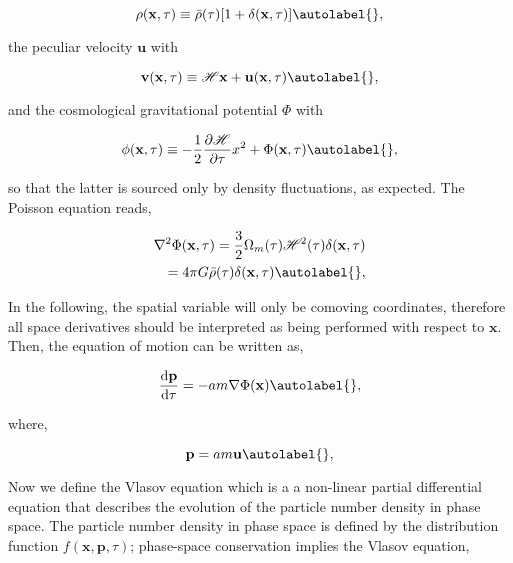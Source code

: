 \begin{equation}
    \rho(\mathbf{x}, \tau) \equiv \bar{\rho}(\tau)[1+\delta(\mathbf{x}, \tau)] \autolabel{},
\end{equation}


the peculiar velocity $\mathbf{u}$ with


\begin{equation}
    \mathbf{v}(\mathbf{x}, \tau) \equiv \mathcal{H} \mathbf{x}+\mathbf{u}(\mathbf{x}, \tau) \autolabel{},
\end{equation}


and the cosmological gravitational potential $\Phi$ with


\begin{equation}
    \phi(\mathbf{x}, \tau) \equiv-\frac{1}{2} \frac{\partial \mathcal{H}}{\partial \tau} x^{2}+\Phi(\mathbf{x}, \tau) \autolabel{},
\end{equation}


so that the latter is sourced only by density fluctuations, as expected. The Poisson equation reads,


\begin{align*}
    \nabla^{2} \Phi(\mathbf{x}, \tau)=\frac{3}{2} \Omega_{m}(\tau) \mathcal{H}^{2}(\tau) \delta(\mathbf{x}, \tau) \\
    =  4\pi G \bar{\rho}(\tau)\delta(\mathbf{x}, \tau) \autolabel{},
\end{align*}
    
In the following, the spatial variable will only be comoving coordinates, therefore all space derivatives should be interpreted as being performed with respect to $\mathbf{x}$. Then, the equation of motion can be written as,


\begin{equation}
    \frac{\mathrm{d} \mathbf{p}}{\mathrm{d} \tau}=-a m \nabla \Phi(\mathbf{x}) \autolabel{},
\end{equation}


where,


\begin{equation}
    \mathbf{p}=a m \mathbf{u} \autolabel{},
\end{equation}


Now we define the Vlasov equation which is a a non-linear partial differential equation that describes the evolution of the particle number density in phase space. The particle number density in phase space is defined by the distribution function $f(\mathbf{x}, \mathbf{p}, \tau)$; phase-space conservation implies the Vlasov equation,


